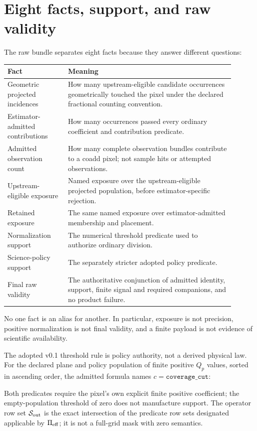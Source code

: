 \documentclass[10pt]{article}
\begin{document}
\clearpage
\section{Eight facts, support, and raw validity}

The raw bundle separates eight facts because they answer different questions:

\begin{longtable}{L{0.24\linewidth}L{0.66\linewidth}}
\toprule
Fact & Meaning\\
\midrule
Geometric projected incidences & How many upstream-eligible candidate
occurrences geometrically touched the pixel under the declared fractional
counting convention.\\
Estimator-admitted contributions & How many occurrences passed every ordinary
coefficient and contribution predicate.\\
Admitted observation count & How many complete observation bundles contribute
to a coadd pixel; not sample hits or attempted observations.\\
Upstream-eligible exposure & Named exposure over the upstream-eligible
projected population, before estimator-specific rejection.\\
Retained exposure & The same named exposure over estimator-admitted membership
and placement.\\
Normalization support & The numerical threshold predicate used to authorize
ordinary division.\\
Science-policy support & The separately stricter adopted policy predicate.\\
Final raw validity & The authoritative conjunction of admitted identity,
support, finite signal and required companions, and no product failure.\\
\bottomrule
\end{longtable}

No one fact is an alias for another. In particular, exposure is not precision,
positive normalization is not final validity, and a finite payload is not
evidence of scientific availability.

The adopted v0.1 threshold rule is policy authority, not a derived physical
law. For the declared plane and policy population of finite positive \(Q_p\)
values, sorted in ascending order, the admitted formula names
\(c=\texttt{coverage\_cut}\):

\SCIMapThresholdEquations

Both predicates require the pixel's own explicit finite positive coefficient;
the empty-population threshold of zero does not manufacture support. The
operator row set \(\mathcal S_{\rm out}\) is the exact intersection of the
predicate row sets designated applicable by \(\Pi_{\rm eff}\); it is not a
full-grid mask with zero semantics.
\end{document}
